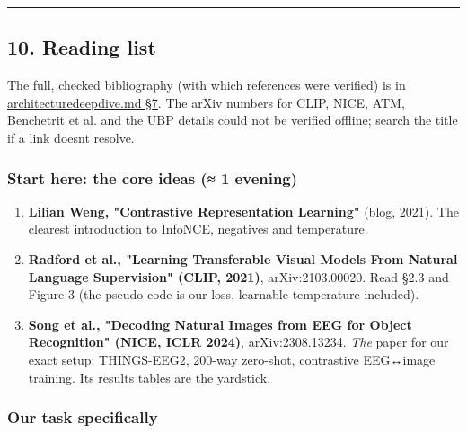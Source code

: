 \documentclass[
  11pt,
]{article}
\providecommand{\tightlist}{%
  \setlength{\itemsep}{0pt}\setlength{\parskip}{0pt}}
\renewcommand{\_}{\oldunderscore\allowbreak}
\begin{document}
\begin{center}\rule{0.5\linewidth}{0.5pt}\end{center}

\subsection{10. Reading
list}\label{reading-list}

The full, checked bibliography (with
which references were verified) is in
\href{architecture_deep_dive.pdf\#7-paper-map-and-bibliography}{architecture\_deep\_dive.md
§7}. The arXiv numbers for CLIP, NICE,
ATM, Benchetrit et al. and the UBP
details could not be verified offline;
search the title if a link
doesn\textquotesingle t resolve.

\subsubsection{Start here: the core
ideas (≈ 1
evening)}\label{start-here-the-core-ideas-1-evening}

\begin{enumerate}
\def\labelenumi{\arabic{enumi}.}
\tightlist
\item
  \textbf{Lilian Weng, "Contrastive
  Representation Learning"} (blog,
  2021). The clearest introduction to
  InfoNCE, negatives and temperature.
\item
  \textbf{Radford et al., "Learning
  Transferable Visual Models From
  Natural Language Supervision" (CLIP,
  2021)}, arXiv:2103.00020. Read §2.3
  and Figure 3 (the pseudo-code is our
  loss, learnable temperature included).
\item
  \textbf{Song et al., "Decoding Natural
  Images from EEG for Object
  Recognition" (NICE, ICLR 2024)},
  arXiv:2308.13234. \emph{The} paper for
  our exact setup: THINGS-EEG2, 200-way
  zero-shot, contrastive EEG↔image
  training. Its results tables are the
  yardstick.
\end{enumerate}

\subsubsection{Our task
specifically}\label{our-task-specifically}
\end{document}
